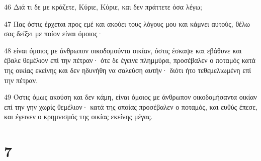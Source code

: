 \par 46 Διά τι δε με κράζετε, Κύριε, Κύριε, και δεν πράττετε όσα λέγω;
\par 47 Πας όστις έρχεται προς εμέ και ακούει τους λόγους μου και κάμνει αυτούς, θέλω σας δείξει με ποίον είναι όμοιος·
\par 48 είναι όμοιος με άνθρωπον οικοδομούντα οικίαν, όστις έσκαψε και εβάθυνε και έβαλε θεμέλιον επί την πέτραν· ότε δε έγεινε πλημμύρα, προσέβαλεν ο ποταμός κατά της οικίας εκείνης και δεν ηδυνήθη να σαλεύση αυτήν· διότι ήτο τεθεμελιωμένη επί την πέτραν.
\par 49 Όστις όμως ακούση και δεν κάμη, είναι όμοιος με άνθρωπον οικοδομήσαντα οικίαν επί την γην χωρίς θεμέλιον· κατά της οποίας προσέβαλεν ο ποταμός, και ευθύς έπεσε, και έγεινεν ο κρημνισμός της οικίας εκείνης μέγας.

\chapter{7}

